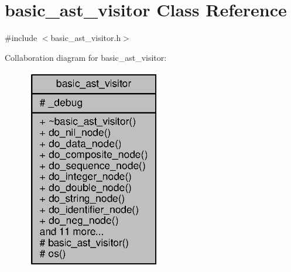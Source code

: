 \section{basic\+\_\+ast\+\_\+visitor Class Reference}
\label{classbasic__ast__visitor}


{\ttfamily \#include $<$basic\+\_\+ast\+\_\+visitor.\+h$>$}



Collaboration diagram for basic\+\_\+ast\+\_\+visitor\+:
\nopagebreak
\begin{figure}[H]
\begin{center}
\leavevmode
\includegraphics[width=168pt]{classbasic__ast__visitor__coll__graph}
\end{center}
\end{figure}
